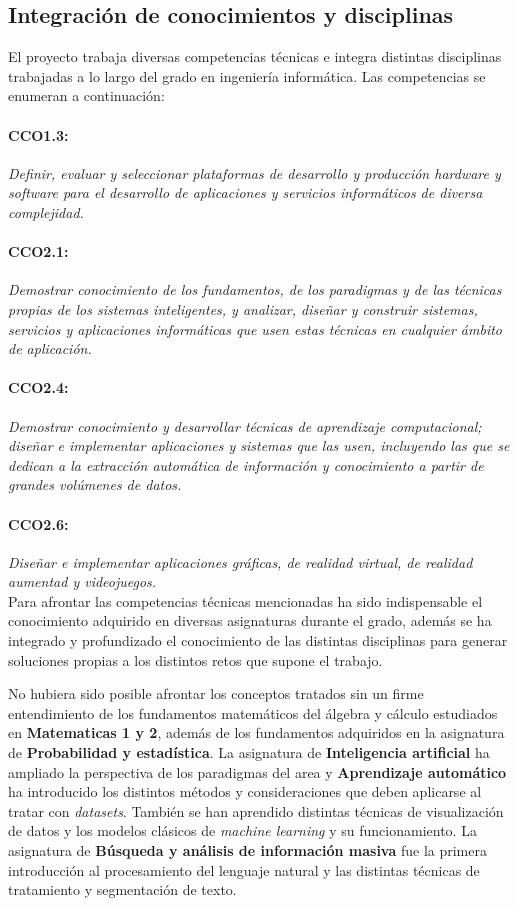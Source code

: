 \subsection{Integración de conocimientos y disciplinas}
El proyecto trabaja diversas competencias técnicas e integra distintas disciplinas trabajadas a lo largo del grado en ingeniería informática. Las competencias se enumeran a continuación:

\paragraph{CCO1.3:}\textit{Definir, evaluar y seleccionar plataformas de desarrollo y producción hardware y software para el desarrollo de aplicaciones y servicios informáticos de diversa complejidad.}%
\paragraph{CCO2.1:}\textit{Demostrar conocimiento de los fundamentos, de los paradigmas y de las técnicas propias de los sistemas inteligentes, y analizar, diseñar y construir sistemas, servicios y aplicaciones informáticas que usen estas técnicas en cualquier ámbito de aplicación.}%
\paragraph{CCO2.4:}\textit{Demostrar conocimiento y desarrollar técnicas de aprendizaje computacional; diseñar e implementar aplicaciones y sistemas que las usen, incluyendo las que se dedican a la extracción automática de información y conocimiento a partir de grandes volúmenes de datos.}%
\paragraph{CCO2.6:}\textit{Diseñar e implementar aplicaciones gráficas, de realidad virtual, de realidad aumentad y videojuegos.}%
\\

Para afrontar las competencias técnicas mencionadas ha sido indispensable el conocimiento adquirido en diversas asignaturas durante el grado, además se ha integrado y profundizado el conocimiento de las distintas disciplinas para generar soluciones propias a los distintos retos que supone el trabajo.

No hubiera sido posible afrontar los conceptos tratados sin un firme entendimiento de los fundamentos matemáticos del álgebra y cálculo estudiados en \textbf{Matematicas 1 y 2}, además de los fundamentos adquiridos en la asignatura de \textbf{Probabilidad y estadística}.
La asignatura de \textbf{Inteligencia artificial} ha ampliado la perspectiva de los paradigmas del area y \textbf{Aprendizaje automático} ha introducido los distintos métodos y consideraciones que deben aplicarse al tratar con \textit{datasets}. También se han aprendido distintas técnicas de visualización de datos y los modelos clásicos de \textit{machine learning} y su funcionamiento.
La asignatura de \textbf{Búsqueda y análisis de información masiva} fue la primera introducción al procesamiento del lenguaje natural y las distintas técnicas de tratamiento y segmentación de texto.

